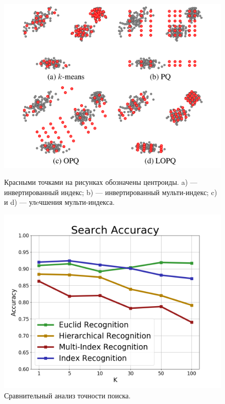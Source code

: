 \begin{figure}[h]
\begin{minipage}[h]{0.48\linewidth}
\includegraphics[width=1\linewidth]{Images/LOPQ.png}
\caption{Красными точками на рисунках обозначены центроиды. a) — инвертированный индекс; b) — инвертированный мульти-индекс; c) и d) — улeчшения мульти-индекса.}
\label{ris:lopq}
\end{minipage}
\hfill
\begin{minipage}[h]{0.48\linewidth}
\includegraphics[width=1\linewidth]{Images/SearchAccuracy.png}
\caption{Сравнительный анализ точности поиска.}
\label{ris:searchaccuracy}
\end{minipage}
\end{figure}

